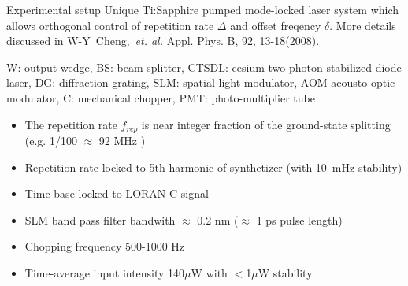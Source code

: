 \begin{block}{Experimental setup}
  Unique Ti:Sapphire pumped mode-locked laser system which allows orthogonal control of repetition rate $\Delta$ and offset freqency $\delta$. More details discussed in W-Y~Cheng,~\emph{et. al.} Appl. Phys. B, 92, 13-18(2008).
  \begin{figure}
    \begin{center}
      \setlength\fboxsep{0pt}
      \setlength\fboxrule{0.5pt}
    \end{center}
    \label{Schematic of the experimental setup}
  \end{figure}
  W: output wedge, BS: beam splitter, CTSDL: cesium two-photon stabilized diode laser, DG: diffraction grating, SLM: spatial light modulator, AOM acousto-optic modulator, C: mechanical chopper, PMT: photo-multiplier tube
  \begin{itemize}
  \item The repetition rate $f_{rep}$ is near integer fraction of the ground-state splitting (e.g. 1/100 $\approx$ 92 MHz )
  \item Repetition rate locked to 5th harmonic of synthetizer (with 10~mHz stability)
  \item Time-base locked to LORAN-C signal
  \item SLM band pass filter bandwith $\approx$ 0.2 nm ($\approx$ 1 ps pulse length)
  \item Chopping frequency 500-1000 Hz
  \item Time-average input intensity 140$\mu$W with $<$1$\mu$W stability
  \end{itemize}
\end{block}
